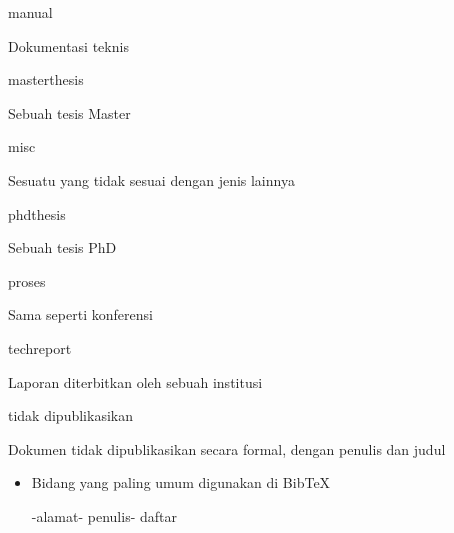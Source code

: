 \begin{itemize}
manual\par




Dokumentasi teknis\par




masterthesis\par




Sebuah tesis Master\par




misc\par




Sesuatu yang tidak sesuai dengan jenis lainnya\par




phdthesis\par




Sebuah tesis PhD\par




proses\par




Sama seperti konferensi\par




techreport\par




Laporan diterbitkan oleh sebuah institusi\par




tidak dipublikasikan\par




Dokumen tidak dipublikasikan secara formal, dengan penulis dan judul\par



\begin{itemize}
	\item Bidang yang paling umum digunakan di BibTeX\hspace*{0.5in}\par

\hspace*{0.5in}-alamat\hspace*{0.5in}\hspace*{0.5in}\hspace*{0.5in}- penulis\hspace*{0.5in}\hspace*{0.5in}- daftar\par


\end{itemize}
\end{itemize}
